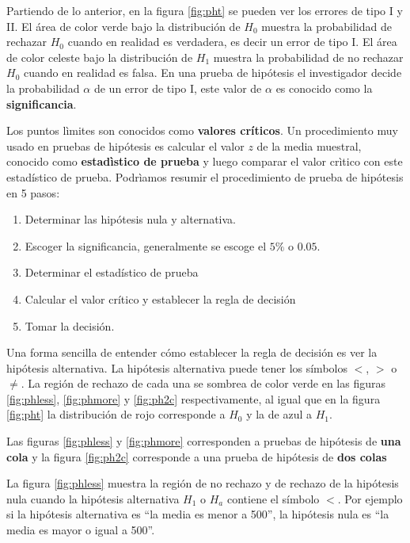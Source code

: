 \documentclass[letterpaper,]{book}
\providecommand{\tightlist}{%
  \setlength{\itemsep}{0pt}\setlength{\parskip}{0pt}}
\begin{document}
Partiendo de lo anterior, en la figura \ref{fig:pht} se pueden ver los errores de tipo I y II. El área de color verde bajo la distribución de \(H_0\) muestra la probabilidad de rechazar \(H_0\) cuando en realidad es verdadera, es decir un error de tipo I. El área de color celeste bajo la distribución de \(H_1\) muestra la probabilidad de no rechazar \(H_0\) cuando en realidad es falsa. En una prueba de hipótesis el investigador decide la probabilidad \(\alpha\) de un error de tipo I, este valor de \(\alpha\) es conocido como la \textbf{significancia}.

Los puntos lìmites son conocidos como \textbf{valores críticos}. Un procedimiento muy usado en pruebas de hipótesis es calcular el valor \(z\) de la media muestral, conocido como \textbf{estadìstico de prueba} y luego comparar el valor crìtico con este estadístico de prueba. Podrìamos resumir el procedimiento de prueba de hipótesis en 5 pasos:

\begin{enumerate}
\def\labelenumi{\arabic{enumi}.}
\tightlist
\item
  Determinar las hipótesis nula y alternativa.
\item
  Escoger la significancia, generalmente se escoge el \(5\%\) o \(0.05\).
\item
  Determinar el estadístico de prueba
\item
  Calcular el valor crítico y establecer la regla de decisión
\item
  Tomar la decisión.
\end{enumerate}

Una forma sencilla de entender cómo establecer la regla de decisión es ver la hipótesis alternativa. La hipótesis alternativa puede tener los símbolos \(<\), \(>\) o \(\neq\). La región de rechazo de cada una se sombrea de color verde en las figuras \ref{fig:phless}, \ref{fig:phmore} y \ref{fig:ph2c} respectivamente, al igual que en la figura \ref{fig:pht} la distribución de rojo corresponde a \(H_0\) y la de azul a \(H_1\).

Las figuras \ref{fig:phless} y \ref{fig:phmore} corresponden a pruebas de hipótesis de \textbf{una cola} y la figura \ref{fig:ph2c} corresponde a una prueba de hipótesis de \textbf{dos colas}

La figura \ref{fig:phless} muestra la región de no rechazo y de rechazo de la hipótesis nula cuando la hipótesis alternativa \(H_1\) o \(H_a\) contiene el símbolo \(<\). Por ejemplo si la hipótesis alternativa es ``la media es menor a 500'', la hipótesis nula es ``la media es mayor o igual a 500''.
\end{document}
